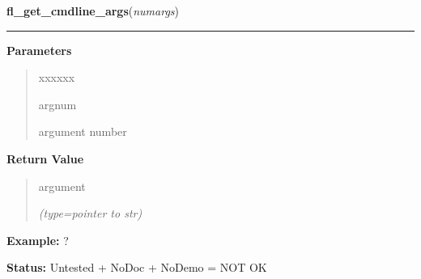     \label{xformslib:flbasic:fl_get_cmdline_args}

    \vspace{0.5ex}

\hspace{.8\funcindent}\begin{boxedminipage}{\funcwidth}

    \raggedright \textbf{fl\_get\_cmdline\_args}(\textit{numargs})

    \vspace{-1.5ex}

    \rule{\textwidth}{0.5\fboxrule}
\setlength{\parskip}{2ex}
\setlength{\parskip}{1ex}
      \textbf{Parameters}
      \vspace{-1ex}

      \begin{quote}
        \begin{Ventry}{xxxxxx}

          \item[argnum]

          argument number

        \end{Ventry}

      \end{quote}

      \textbf{Return Value}
    \vspace{-1ex}

      \begin{quote}
      argument

      {\it (type=pointer to str)}

      \end{quote}

\textbf{Example:} ?



\textbf{Status:} Untested + NoDoc + NoDemo = NOT OK



    \end{boxedminipage}

    \label{xformslib:flbasic:fl_msleep}

    \vspace{0.5ex}

